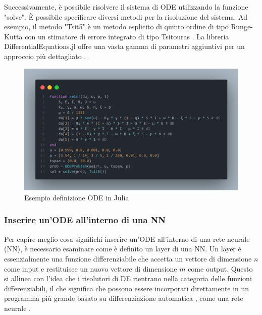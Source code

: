 Successivamente, è possibile risolvere il sistema di ODE utilizzando la 
funzione "solve". È possibile specificare diversi metodi per la 
risoluzione del sistema. Ad esempio, il metodo "Tsit5" è un metodo 
esplicito di quinto ordine di tipo Runge-Kutta con un stimatore di 
errore integrato di tipo Tsitouras \cite{10.1016/j.camwa.2011.06.002}. 
La libreria DifferentialEquations.jl offre una vasta gamma di parametri 
aggiuntivi per un approccio più dettagliato \cite{rackauckas2017differentialequations}.

\begin{figure}[H]
    \begin{center}
        \includegraphics[width=\textwidth]{img/fdefinition.png}
        \caption{Esempio definizione ODE in Julia}
        \label{fig:ODE_Julia_example}
    \end{center}
\end{figure}

\subsubsection{Inserire un'ODE all'interno di una NN}

Per capire meglio cosa significhi inserire un'ODE all'interno di una 
rete neurale (NN), è necessario esaminare come è definito un layer di 
una NN. Un layer è essenzialmente una funzione differenziabile che 
accetta un vettore di dimensione $n$ come input e restituisce un nuovo 
vettore di dimensione $m$ come output. Questo si allinea con l'idea che 
i risolutori di DE rientrano nella categoria delle funzioni 
differenziabili, il che significa che possono essere incorporati 
direttamente in un programma più grande basato su differenziazione 
automatica \cite{BARTHOLOMEWBIGGS2000171}, come una rete neurale \cite{Flux.jl-2018} \cite{pal2023lux}. 

